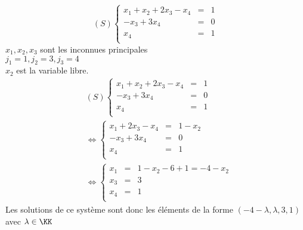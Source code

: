 \documentclass[../main.tex]{subfile}
\begin{document}
\begin{ex}
$$
	(S) \left\{
	\begin{array}{rcl}
		x_1 + x_2 + 2x_3 - x_4 &=& 1 \\
		- x_3 + 3x_4 &=& 0 \\
		x_4 &=& 1 \\
	\end{array}
	\right.
$$	
	$x_1, x_2, x_3$ sont les inconnues principales\\
	$j_1=1, j_2=3, j_3=4$\\
	$x_2$ est la variable libre.
$$
\begin{aligned}
	&(S) \left\{
	\begin{array}{rcl}
		x_1 + x_2 + 2x_3 - x_4 &=& 1 \\
		- x_3 + 3x_4 &=& 0 \\
		x_4 &=& 1 \\
	\end{array}
	\right.\\
	&\Leftrightarrow \left\{
	\begin{array}{rcl}
		x_1 + 2x_3 - x_4 &=& 1 - x_2\\
		- x_3 + 3x_4 &=& 0 \\
		x_4 &=& 1 \\
	\end{array}
	\right.\\
	&\Leftrightarrow \left\{
	\begin{array}{rcl}
		x_1 &=& 1 - x_2 - 6 + 1 = -4 - x_2\\
		x_3 &=& 3 \\
		x_4 &=& 1 \\
	\end{array}
	\right.
\end{aligned}
$$	
	Les solutions de ce système sont donc les éléments de la forme 
	$(-4 - \lambda, \lambda, 3, 1)$ avec $\lambda \in \KK$
\end{ex}
\end{document}
